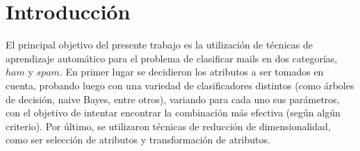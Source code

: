 \section{Introducción}

El principal objetivo del presente trabajo es la utilización de técnicas de aprendizaje automático para el problema de clasificar mails en dos categorías, $ham$ y $spam$. En primer lugar se decidieron los atributos a ser tomados en cuenta, probando luego con una variedad de clasificadores distintos (como árboles de decisión, naive Bayes, entre otros), variando para cada uno sus parámetros, con el objetivo de intentar encontrar la combinación más efectiva (según algún criterio). Por último, se utilizaron técnicas de reducción de dimensionalidad, como ser selección de atributos y transformación de atributos.